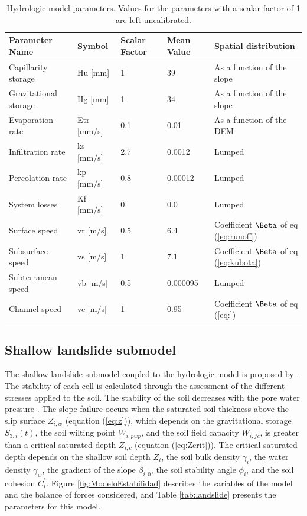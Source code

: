 \documentclass[hess, manuscript]{copernicus}
\begin{document}
\begin{table}[]
        \centering
        \begin{tabularx}{\textwidth}{p{3cm} p{2.2cm} p{1.5cm} p{2cm} p{3.5cm}}
\hline
Parameter Name & Symbol & Scalar Factor & Mean Value & Spatial distribution \\
\hline
Capillarity storage & Hu [mm] & 1 & 39 & As a function of the slope \\
Gravitational storage & Hg [mm] & 1 & 34 & As a function of the slope \\
Evaporation rate & Etr [mm/s] & 0.1 & 0.01 & As a function of the DEM \\
Infiltration rate & ks [mm/s] & 2.7 & 0.0012 & Lumped \\
Percolation rate & kp [mm/s] & 0.8 & 0.00012 & Lumped \\
System losses & Kf [mm/s] & 0 & 0.0 & Lumped \\
Surface speed & vr [m/s] & 0.5 & 6.4 & Coefficient $\Beta$ of eq (\ref{eq:runoff}) \\
Subsurface speed & vs [m/s] & 1 & 7.1 & Coefficient $\Beta$ of eq (\ref{eq:kubota})\\
Subterranean speed & vb [m/s] & 0.5 & 0.000095 & Lumped \\
Channel speed & vc [m/s] & 1 & 0.95 & Coefficient $\Beta$ of eq (\ref{eq:}) \\
\hline
\end{tabularx}
        \caption{Hydrologic model parameters. Values for the parameters with a scalar factor of 1 are left uncalibrated. }
        \label{tab:parameters}
    \end{table}

\subsection{Shallow landslide submodel}

The shallow landslide submodel coupled to the hydrologic model is proposed by  \citet{Aristizabal2016}. The stability of each cell is calculated through the assessment of the different stresses applied to the soil. The stability of the soil decreases with the pore water pressure \citep{Graham1984}. The slope failure occurs when the saturated soil thickness above the slip surface $Z_{i,w}$ (equation (\ref{eq:z})), which depends on the gravitational storage $S_{3,i}(t)$, the soil wilting point $W_{i,pwp}$, and the soil field capacity $W_{i,fc}$, is greater than a critical saturated depth $Z_{i,c}$ (equation (\ref{eq:Zcrit})). The critical saturated depth depends on the shallow soil depth $Z_i$, the soil bulk density $\gamma_i$, the water density $\gamma_w$, the gradient of the slope $\beta_{i,0}$, the soil stability angle $\phi_i$, and the soil cohesion $C^{'}_i$.  Figure \ref{fig:ModeloEstabilidad} describes the variables of the model and the balance of forces considered, and Table \ref{tab:landslide} presents the parameters for this model.
\end{document}
